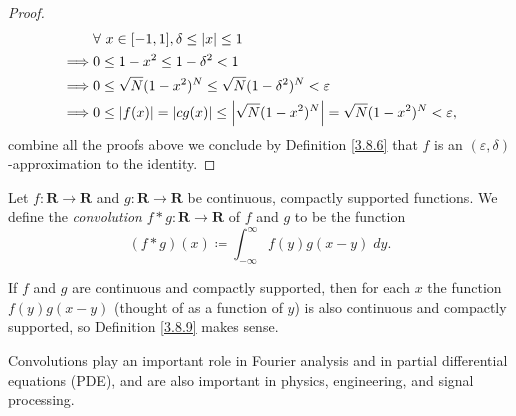 \begin{proof}
    \begin{align*}
                 & \forall\ x \in [-1, 1], \delta \leq \abs*{x} \leq 1                                                      \\
        \implies & 0 \leq 1 - x^2 \leq 1 - \delta^2 < 1                                                                     \\
        \implies & 0 \leq \sqrt{N} (1 - x^2)^N \leq \sqrt{N} (1 - \delta^2)^N < \varepsilon                                 \\
        \implies & 0 \leq \abs*{f(x)} = \abs*{cg(x)} \leq \abs*{\sqrt{N} (1 - x^2)^N} = \sqrt{N} (1 - x^2)^N < \varepsilon,
    \end{align*}
    combine all the proofs above we conclude by Definition \ref{3.8.6} that \(f\) is an \((\varepsilon, \delta)\)-approximation to the identity.
\end{proof}

\begin{definition}[Convolution]\label{3.8.9}
    Let \(f : \mathbf{R} \to \mathbf{R}\) and \(g : \mathbf{R} \to \mathbf{R}\) be continuous, compactly supported functions.
    We define the \emph{convolution} \(f * g : \mathbf{R} \to \mathbf{R}\) of \(f\) and \(g\) to be the function
    \[
        (f * g)(x) \coloneqq \int_{-\infty}^\infty f(y) g(x - y) \; dy.
    \]
\end{definition}

\begin{note}
    If \(f\) and \(g\) are continuous and compactly supported, then for each \(x\) the function \(f(y) g(x - y)\) (thought of as a function of \(y\)) is also continuous and compactly supported, so Definition \ref{3.8.9} makes sense.
\end{note}

\begin{remark}\label{3.8.10}
    Convolutions play an important role in Fourier analysis and in partial differential equations (PDE), and are also important in physics, engineering, and signal processing.
\end{remark}

